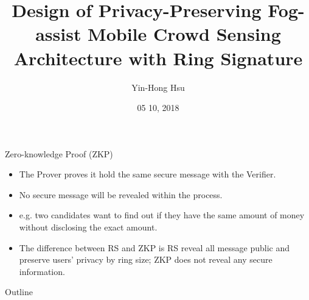 \documentclass{beamer}
\title {
    Design of Privacy-Preserving Fog-assist Mobile Crowd Sensing Architecture with Ring Signature
}
\author {
    Yin-Hong Hsu
}
\date {
    05 10, 2018
}
\begin{document}
\begin{frame}
    \titlepage
\end{frame}


\begin{frame}{Zero-knowledge Proof (ZKP)}
    \begin{itemize}
        \item {The Prover proves it hold the same secure message with the Verifier.}
        \item {No secure message will be revealed within the process.}
        \item {e.g. two candidates want to find out if they have the same amount of money without disclosing the exact amount.}
        \item {The difference between RS and ZKP is RS reveal all message public and preserve users' privacy by ring size; ZKP does not reveal any secure information.}
    \end{itemize}
\end{frame}
\begin{frame}{Outline}
    \tableofcontentsgather
    \tableofcontents
\end{frame}
\end{document}
